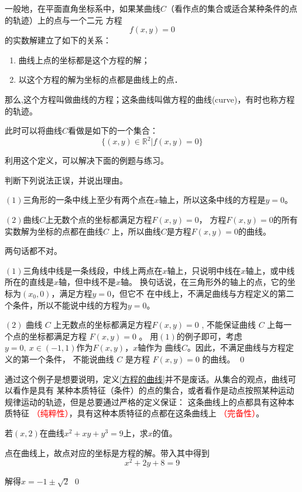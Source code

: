 \begin{definition}\label{方程的曲线}
    一般地，在平面直角坐标系中，如果某曲线$C$（看作点的集合或适合某种条件的点的轨迹）上的点与一个二元
方程\[f(x,y)=0\]的实数解建立了如下的关系：
\vspace*{-8pt}
\begin{enumerate}[(1)]
    \setlength{\itemsep}{-\itemsep}
    \item 曲线上点的坐标都是这个方程的解；
    \item 以这个方程的解为坐标的点都是曲线上的点．
\end{enumerate}
\vspace*{-8pt}
那么,这个方程叫做曲线的方程；这条曲线叫做方程的曲线(curve)，有时也称方程的轨迹。

此时可以将曲线$C$看做是如下的一个集合：
\vspace*{-10pt}
\[\{(x,y)\in\mathbb{R}^2|f(x,y)=0\}\]
\end{definition}
利用这个定义，可以解决下面的例题与练习。
\begin{example}判断下列说法正误，并说出理由。

    $(1)$三角形的一条中线上至少有两个点在$x$轴上，所以这条中线的方程是$y=0$。

    \((2)\)曲线\(C\)上无数个点的坐标都满足方程$F(x,y)=0$，
    方程$F(x,y)=0$的所有实数解为坐标的点都在曲线$C$
    上，所以曲线\(C\)是方程$F(x,y)=0$的曲线。
\end{example}
\begin{jie}
    两句话都不对。

    \((1)\)三角线中线是一条线段，中线上两点在\(x\)轴上，只说明中线在\(x\)轴上，或中线所在的直线是\(x\)轴，但中线不是\(x\)轴。
    换句话说，在三角形外的轴上的点，它的坐标为\((x_0,0)\)，满足方程$y=0$，但它不
    在中线上，不满足曲线与方程定义的第二个条件，所以不能说中线的方程为\(y=0\)。

    \((2)\) 曲线 $ C $ 上无数点的坐标都满足方程$  F(x, y)   =0$ , 
    不能保证曲线  $C $ 上每一个点的坐标都满足方程  $F(x ,  y)=0$ 。
    用\((1)\)的例子即可，考虑\(y=0,\ x\in(-1,1)\)作为\(F(x,y)\)，\(x\)轴作为
    曲线\(C\)。因此，不满足曲线与方程定义的第一个条件， 不能说曲线  $C$  是方程 $ F(x, y)=0$  的曲线。
\qed
\end{jie}

通过这个例子是想要说明，定义\ref{方程的曲线}并不是废话。从集合的观点，曲线可以看作是具有
某种本质特征（条件）的点的集合，或者看作是动点按照某种运动规律运动的轨迹，但是总要通过严格的定义保证：
这条曲线上的点都具有这种本质特征 \textcolor{red}{（纯粹性）}，具有这种本质特征的点都在这条曲线上 \textcolor{red}{（完备性）}。
\begin{example}
若\((x,2)\)在曲线\(x^2+xy+y^3=9\)上，求\(x\)的值。
\end{example}
\begin{jie}
    点在曲线上，故点对应的坐标是方程的解。带入其中得到
    \[x^2+2y+8=9\]

    解得\(x=-1\pm\sqrt{2}\)
    \qed
\end{jie}

